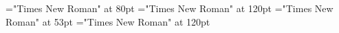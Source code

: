 \documentclass[a4paper]{article}
\begin{document}
\pagestyle{plain}
\sloppy
\setlength{\parfillskip}{0pt plus 1fil}
\font\pa="Times New Roman" at 80pt
\font\childapa="Times New Roman" at 120pt
\font\childbpa="Times New Roman" at 53pt
\font\childaenpa="Times New Roman" at 120pt

\mbox{} 
\newpage 
\newpage 
\setcounter{page}{1} 
\pagestyle{fancy} 


\end{document}
